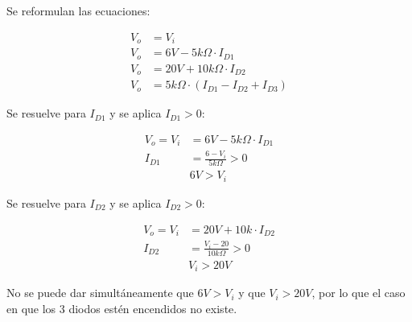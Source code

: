 \documentclass[12pt]{article}
\begin{document}
Se reformulan las ecuaciones:

\begin{align*}
  V_o &= V_i \\
  V_o &= 6V - 5k\Omega \cdot I_{D1} \\
  V_o &= 20V + 10k\Omega \cdot I_{D2} \\
  V_o &= 5k\Omega \cdot \left( I_{D1} - I_{D2} + I_{D3} \right)
\end{align*}

Se resuelve para $I_{D1}$ y se aplica $I_{D1} > 0$:

\begin{align*}
  V_o = V_i &= 6V - 5k\Omega \cdot I_{D1} \\
  I_{D1} &= \frac{6 - V_i}{5k\Omega} > 0 \\
  & 6V > V_i
\end{align*}

Se resuelve para $I_{D2}$ y se aplica $I_{D2} > 0$:

\begin{align*}
  V_o = V_i &= 20V + 10k \cdot I_{D2} \\
  I_{D2} &= \frac{V_i - 20}{10k\Omega} > 0 \\
  & V_i > 20V
\end{align*}

No se puede dar simultáneamente que $6V > V_i$ y que  $V_i > 20V$, por lo que el
caso en que los 3 diodos estén encendidos no existe.
\end{document}
